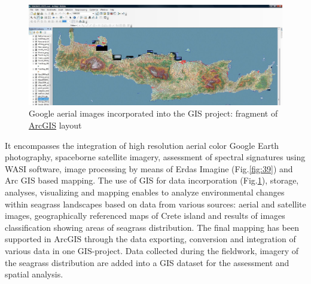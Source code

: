 \documentclass[11pt]{article}
\begin{document}
\begin{figure}
	\begin{center}
		\includegraphics[scale=0.25]{Fig-37.jpg}
		\caption{Google aerial images incorporated into the GIS project: fragment of \href{http://www.esri.com/software/arcgis/index.html}{ArcGIS} layout}
		\label{fig:4.17}
	\end{center}
\end{figure}

It encompasses the integration of
high resolution aerial color Google Earth photography, spaceborne satellite imagery, assessment of
spectral signatures using WASI software, image processing by means of Erdas Imagine (Fig.\ref{fig:39}) and Arc GIS based mapping. The use of GIS for data incorporation (Fig.\ref{fig:4.17}), storage, analyses, visualizing and mapping
enables to analyze environmental changes within seagrass landscapes based on data from various
sources: aerial and satellite images, geographically referenced maps of Crete island and results of
images classification showing areas of seagrass distribution.
The final mapping has been supported in ArcGIS through the data exporting, conversion and
integration of various data in one GIS-project. Data collected during the fieldwork, imagery
of the seagrass distribution are added into a GIS dataset for the assessment and spatial analysis.
\end{document}
